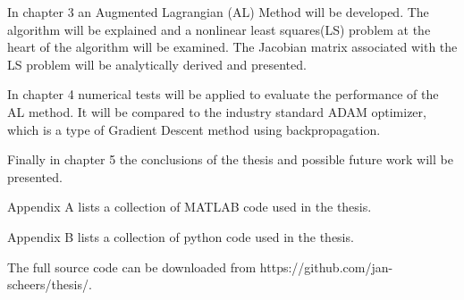In chapter 3 an Augmented Lagrangian (AL) Method will be developed. The algorithm will be explained and a nonlinear least squares(LS) problem at the heart of the algorithm will be examined. The Jacobian matrix associated with the LS problem will be analytically derived and presented.

In chapter 4 numerical tests will be applied to evaluate the performance of the AL method. It will be compared to the industry standard ADAM optimizer, which is a type of Gradient Descent method using backpropagation.

Finally in chapter 5 the conclusions of the thesis and possible future work will be presented.

Appendix A lists a collection of MATLAB code used in the thesis.

Appendix B lists a collection of python code used in the thesis.

The full source code can be downloaded from https://github.com/jan-scheers/thesis/.



